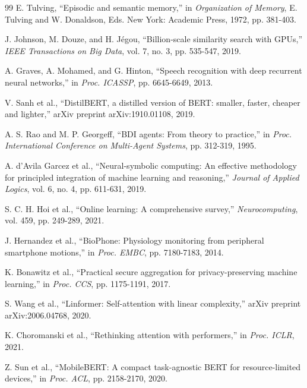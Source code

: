 \documentclass[conference]{IEEEtran}
\begin{document}
\begin{thebibliography}{99}
E. Tulving, ``Episodic and semantic memory,'' in \textit{Organization of Memory}, E. Tulving and W. Donaldson, Eds. New York: Academic Press, 1972, pp. 381-403.

J. Johnson, M. Douze, and H. Jégou, ``Billion-scale similarity search with GPUs,'' \textit{IEEE Transactions on Big Data}, vol. 7, no. 3, pp. 535-547, 2019.

A. Graves, A. Mohamed, and G. Hinton, ``Speech recognition with deep recurrent neural networks,'' in \textit{Proc. ICASSP}, pp. 6645-6649, 2013.

V. Sanh et al., ``DistilBERT, a distilled version of BERT: smaller, faster, cheaper and lighter,'' arXiv preprint arXiv:1910.01108, 2019.

A. S. Rao and M. P. Georgeff, ``BDI agents: From theory to practice,'' in \textit{Proc. International Conference on Multi-Agent Systems}, pp. 312-319, 1995.

A. d'Avila Garcez et al., ``Neural-symbolic computing: An effective methodology for principled integration of machine learning and reasoning,'' \textit{Journal of Applied Logics}, vol. 6, no. 4, pp. 611-631, 2019.

S. C. H. Hoi et al., ``Online learning: A comprehensive survey,'' \textit{Neurocomputing}, vol. 459, pp. 249-289, 2021.

J. Hernandez et al., ``BioPhone: Physiology monitoring from peripheral smartphone motions,'' in \textit{Proc. EMBC}, pp. 7180-7183, 2014.

K. Bonawitz et al., ``Practical secure aggregation for privacy-preserving machine learning,'' in \textit{Proc. CCS}, pp. 1175-1191, 2017.

S. Wang et al., ``Linformer: Self-attention with linear complexity,'' arXiv preprint arXiv:2006.04768, 2020.

K. Choromanski et al., ``Rethinking attention with performers,'' in \textit{Proc. ICLR}, 2021.

Z. Sun et al., ``MobileBERT: A compact task-agnostic BERT for resource-limited devices,'' in \textit{Proc. ACL}, pp. 2158-2170, 2020.

\end{thebibliography}
\end{document}
